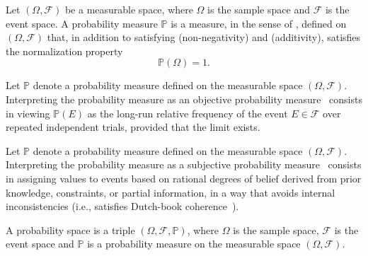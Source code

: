 \begin{definition}
	\label{def:probability}
	Let $(\Omega, \mathcal{F})$ be a measurable space, where $\Omega$ is the sample space and $\mathcal{F}$ is the event space. A probability measure $\mathbb{P}$ is a measure, in the sense of , defined on $(\Omega, \mathcal{F})$ that, in addition to satisfying  (non-negativity) and  (additivity), satisfies the normalization property
	\begin{equation}
		\mathbb{P}(\Omega) = 1.
	\end{equation}
\end{definition}

\begin{definition}
	\label{def:objective_probability}
	Let $\mathbb{P}$ denote a probability measure defined on the measurable space $(\Omega, \mathcal{F})$. Interpreting the probability measure as an objective probability measure~\cite{Leamer1978,freedman2007} consists in viewing $\mathbb{P}(E)$ as the long-run relative frequency of the event $E\in\mathcal{F}$ over repeated independent trials, provided that the limit exists.
\end{definition}

\begin{definition}
	\label{def:subjective_probability}
	Let $\mathbb{P}$ denote a probability measure defined on the measurable space $(\Omega, \mathcal{F})$. Interpreting the probability measure as a subjective probability measure~\cite{shafer1987,hoff2009first} consists in assigning values to events based on rational degrees of belief derived from prior knowledge, constraints, or partial information, in a way that avoids internal inconsistencies (i.e., satisfies Dutch-book coherence~\cite{vineberg2011}).
\end{definition}

\begin{definition}
	\label{def:probability_space}
	A probability space is a triple $(\Omega, \mathcal{F}, \mathbb{P})$, where $\Omega$ is the sample space,	$\mathcal{F}$ is the event space and $\mathbb{P}$ is a probability measure on the measurable space $(\Omega, \mathcal{F})$.
\end{definition}


